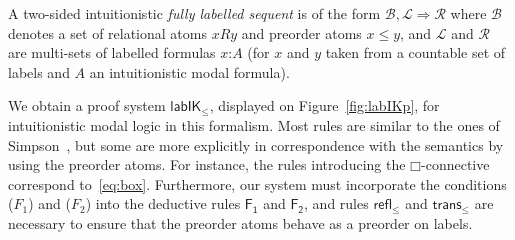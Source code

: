 \documentclass[twoside]{aiml20}
\newcommand*{\rel}{R}
\newcommand*{\BOX}{\mathord{\Box}}
\newcommand*{\IK}{\mathsf{IK}}
\newcommand*{\lab}{\mathsf{lab}}
\newcommand*{\labIKp}{\lab\IK_{\le}}
\newcommand*{\rn}[1]  {\ensuremath{\mathsf{#1}}}
\newcommand*{\lb}[1]{#1}%
\newcommand*{\fm}[1]{#1}%
\newcommand{\SEQ}{\Rightarrow}
\newcommand{\B}{\mathcal{B}}
\newcommand{\Left}{\mathcal{L}}
\newcommand{\Right}{\mathcal{R}}
\newcommand*{\labels}[2]{\lb{#1}\mathord{:}\fm{#2}}
\newcommand*{\accs}[2]{\lb{#1}R\lb{#2}}
\newcommand*{\futs}[2]{\lb{#1}\le{\lb{#2}}}
\begin{document}
\begin{definition}
	A two-sided intuitionistic \emph{fully labelled sequent} is of the form $\B, \Left \SEQ \Right$ where $\B$ denotes a set of relational atoms $\accs xy$ and preorder atoms $\futs xy$, and $\Left$ and $\Right$ are multi-sets of labelled formulas $\labels{x}{A}$ (for $\lb x$ and $\lb y$ taken from a countable set of labels and $A$ an intuitionistic modal formula).
\end{definition}






%
We obtain a proof system $\labIKp$, displayed on Figure~\ref{fig:labIKp}, for intuitionistic modal logic in this formalism. 
%
Most rules are similar to the ones of Simpson~\cite{simpson1994}, but some are more explicitly in correspondence with the semantics by using the preorder atoms. 
%
For instance, the rules introducing the $\BOX$-connective correspond to~\eqref{eq:box}.
%
Furthermore, our system must incorporate the conditions ($F_1$) and ($F_2$) into the deductive rules $\rn{F_1}$ and $\rn{F_2}$, and rules $\rn{refl_\le}$ and $\rn{trans_\le}$ are necessary to ensure that the preorder atoms behave as a preorder on labels.
%

%
%

\end{document}

